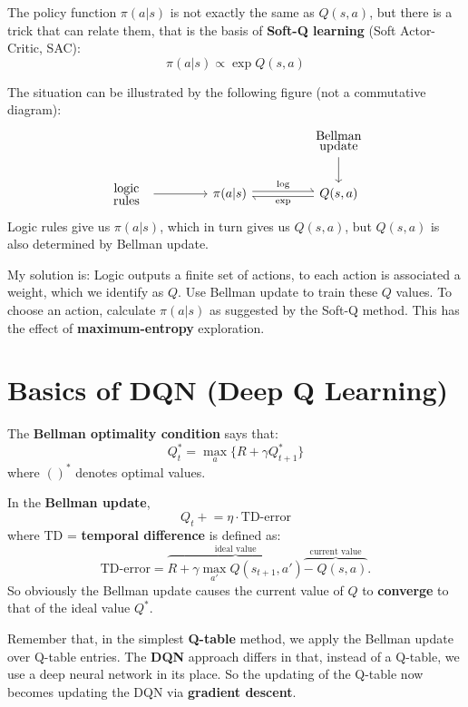 The policy function $\pi(a|s)$ is not exactly the same as $Q(s,a)$, but there is a trick that can relate them, that is the basis of \textbf{Soft-Q learning} (Soft Actor-Critic, SAC):
\begin{equation}
	\pi(a|s) \propto \exp Q(s,a)
\end{equation}

The situation can be illustrated by the following figure (not a commutative diagram):
\begin{equation}
\begin{tikzcd}[column sep=1.5cm, row sep=0.6cm]
	{} & {} & \parbox{1.5cm}{\linespread{-0.5}\selectfont\centering Bellman update} \arrow[d] \\
	\parbox{1.2cm}{\linespread{-0.5}\selectfont\centering logic rules} \arrow[r] 
	& \pi(a|s) \arrow[r,shift left=2pt,harpoon,"\log"]
	& Q(s,a) \arrow[l, shift left=2pt, harpoon, "\exp"] 
\end{tikzcd}
\end{equation}
Logic rules give us $\pi(a|s)$, which in turn gives us $Q(s,a)$, but $Q(s,a)$ is also determined by Bellman update.

My solution is:  Logic outputs a finite set of actions, to each action is associated a weight, which we identify as $Q$.  Use Bellman update to train these $Q$ values.  To choose an action, calculate $\pi(a|s)$ as suggested by the Soft-Q method.  This has the effect of \textbf{maximum-entropy} exploration.

\section{Basics of DQN (Deep Q Learning)}

The \textbf{Bellman optimality condition} says that:
\begin{equation}
	Q^*_t = \max_{a} \{ R + \gamma Q^*_{t+1} \}
\end{equation}
where $()^*$ denotes optimal values.

In the \textbf{Bellman update},
\begin{equation}
	Q_t \mathrel{+}= \eta \cdot \mbox{TD-error}
\end{equation}
where TD = \textbf{temporal difference} is defined as:
\begin{equation}
	\mbox{TD-error} = \overbrace{R + \gamma \max_{a'} Q(s_{t+1},a')}^{\mbox{ideal value}} \overbrace{ - \; Q(s,a)}^{\mbox{current value}} .
\end{equation}
So obviously the Bellman update causes the current value of $Q$ to \textbf{converge} to that of the ideal value $Q^*$.

Remember that, in the simplest \textbf{Q-table} method, we apply the Bellman update over Q-table entries.  The \textbf{DQN} approach differs in that, instead of a Q-table, we use a deep neural network in its place.  So the updating of the Q-table now becomes updating the DQN via \textbf{gradient descent}.
